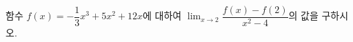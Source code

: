 함수 $f(x)=-\dfrac{1}{3}x^3+5x^2+12x$에 대하여 $\displaystyle\lim_{x\to 2}\dfrac{f(x)-f(2)}{x^2-4}$의 값을 구하시오.
